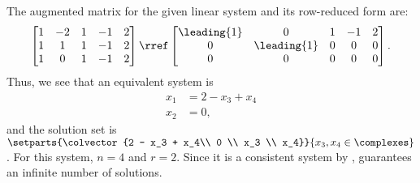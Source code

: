 The augmented matrix for the given linear system and its row-reduced form are:
\begin{align*}
\begin{bmatrix}
1 & -2 & 1 & -1 & 2\\
1 & 1 & 1 & -1 & 2\\
1 & 0 & 1 & -1 & 2
\end{bmatrix}
\rref
\begin{bmatrix}
\leading{1} & 0 & 1 & -1 & 2\\
0 & \leading{1} & 0 & 0 & 0\\
0 & 0 & 0 & 0 & 0
\end{bmatrix}.
\end{align*}
Thus, we see that an equivalent system is
\begin{align*}
x_1 &= 2 - x_3 + x_4\\
x_2 &= 0,
\end{align*}
and the solution set is 
$\setparts{\colvector{2 - x_3 + x_4\\ 0 \\ x_3 \\ x_4}}{x_3, x_4 \in\complexes}$.  For this system, $n = 4$ and $r = 2$.  Since it is a consistent system by ,   guarantees an infinite number of solutions.